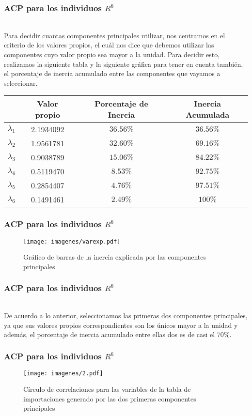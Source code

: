 \documentclass[12pt]{beamer}
\begin{document}
\begin{frame}
\frametitle{ACP para los individuos $R^6$}
~\\Para decidir cuantas componentes principales utilizar, nos centramos en el criterio de los valores propios, el cuál nos dice que debemos utilizar las componentes cuyo valor propio sea mayor a la unidad. Para decidir esto, realizamos la siguiente tabla y la siguiente gráfica para tener en cuenta también, el porcentaje de inercia acumulado entre las componentes que vayamos a seleccionar.

\begin{center}
\begin{tabular}{|c|c|c|c|}
\hline 
 & Valor propio & Porcentaje de Inercia & Inercia Acumulada \\ 
\hline 
$\lambda_1$ & 2.1934092 & $36.56 \%$ & $36.56 \%$ \\ 
$\lambda_2$ & 1.9561781 & $32.60 \%$ & $69.16 \%$ \\  
$\lambda_3$ & 0.9038789 & $15.06 \%$ & $84.22 \%$ \\ 
$\lambda_4$ & 0.5119470 & $8.53 \%$ & $92.75 \%$ \\ 
$\lambda_5$ & 0.2854407 & $4.76 \%$ & $97.51 \%$ \\  
$\lambda_6$ & 0.1491461 & $2.49 \%$ & $100 \% $ \\ 
\hline 
\end{tabular} 
\end{center}
\end{frame}

\begin{frame}
\frametitle{ACP para los individuos $R^6$}
\begin{figure}[h]
  \centering
  \texttt{[image: imagenes/varexp.pdf]}
  \caption{Gráfico de barras de la inercia explicada por las componentes principales}\label{figura1}
\end{figure}
\end{frame}

\begin{frame}
\frametitle{ACP para los individuos $R^6$}
~\\De acuerdo a lo anterior, seleccionamos las primeras dos componentes principales, ya que sus valores propios correspondientes son los únicos mayor a la unidad y además, el porcentaje de inercia acumulado entre ellas dos es de casi el $70\%$.
\end{frame}

\begin{frame}
\frametitle{ACP para los individuos $R^6$}
\begin{figure}[h]
  \centering
  \texttt{[image: imagenes/2.pdf]}
  \caption{Círculo de correlaciones para las variables de la tabla de importaciones generado por las dos
primeras componentes principales}\label{figura1}
\end{figure}
\end{frame}
\end{document}
